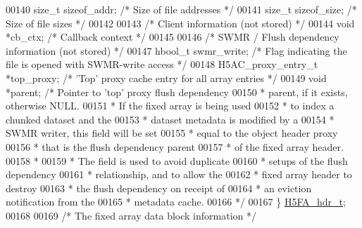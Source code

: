 \begin{DoxyCode}
00140     \textcolor{keywordtype}{size\_t} sizeof\_addr;                 \textcolor{comment}{/* Size of file addresses                                       */}
00141     \textcolor{keywordtype}{size\_t} sizeof\_size;                 \textcolor{comment}{/* Size of file sizes                                           */}
00142 
00143     \textcolor{comment}{/* Client information (not stored) */}
00144     \textcolor{keywordtype}{void} *cb\_ctx;                       \textcolor{comment}{/* Callback context */}
00145 
00146     \textcolor{comment}{/* SWMR / Flush dependency information (not stored) */}
00147     hbool\_t swmr\_write;                 \textcolor{comment}{/* Flag indicating the file is opened with SWMR-write access    */}
00148     H5AC\_proxy\_entry\_t *top\_proxy;      \textcolor{comment}{/* 'Top' proxy cache entry for all array entries */}
00149     \textcolor{keywordtype}{void} *parent;               \textcolor{comment}{/* Pointer to 'top' proxy flush dependency}
00150 \textcolor{comment}{                                         * parent, if it exists, otherwise NULL.}
00151 \textcolor{comment}{                                         * If the fixed array is being used}
00152 \textcolor{comment}{                                         * to index a chunked dataset and the}
00153 \textcolor{comment}{                                         * dataset metadata is modified by a}
00154 \textcolor{comment}{                                         * SWMR writer, this field will be set}
00155 \textcolor{comment}{                                         * equal to the object header proxy}
00156 \textcolor{comment}{                                         * that is the flush dependency parent}
00157 \textcolor{comment}{                                         * of the fixed array header.}
00158 \textcolor{comment}{                     *}
00159 \textcolor{comment}{                     * The field is used to avoid duplicate}
00160 \textcolor{comment}{                     * setups of the flush dependency }
00161 \textcolor{comment}{                     * relationship, and to allow the }
00162 \textcolor{comment}{                     * fixed array header to destroy}
00163 \textcolor{comment}{                     * the flush dependency on receipt of }
00164 \textcolor{comment}{                     * an eviction notification from the}
00165 \textcolor{comment}{                     * metadata cache.}
00166 \textcolor{comment}{                     */}
00167 \} \hyperlink{struct_h5_f_a__hdr__t}{H5FA\_hdr\_t};
00168 
00169 \textcolor{comment}{/* The fixed array data block information */}

\end{DoxyCode}
